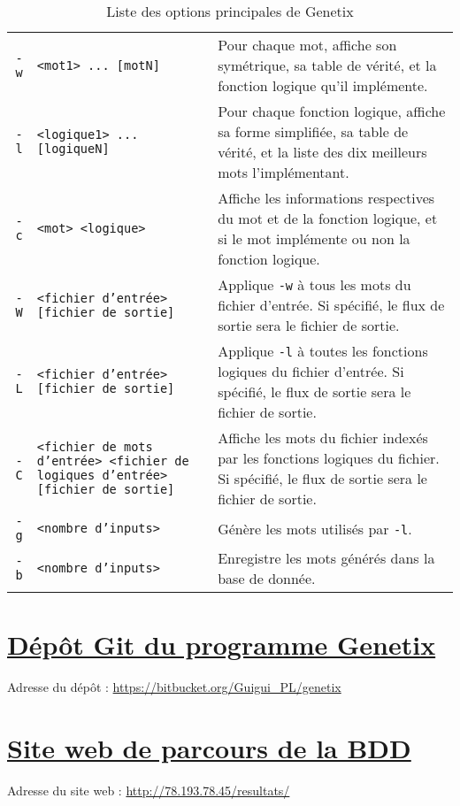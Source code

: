 \begin{table}[!h]
\centering
\begin{tabular}{r L{6cm} L{8cm}}
\toprule
{} &  & \\
\midrule
{} \texttt{-w} & \texttt{<mot1> ... [motN]} & Pour chaque mot, affiche son symétrique, sa table de vérité, et la fonction logique qu'il implémente. \\
 \texttt{-l} & \texttt{<logique1> ... [logiqueN]} & Pour chaque fonction logique, affiche sa forme simplifiée, sa table de vérité, et la liste des dix meilleurs mots l'implémentant. \\
 \texttt{-c} & \texttt{<mot> <logique>} & Affiche les informations respectives du mot et de la fonction logique, et si le mot implémente ou non la fonction logique. \\
\midrule
{} \texttt{-W} & \texttt{<fichier d'entrée> [fichier de sortie]} & Applique \texttt{-w} à tous les mots du fichier d'entrée. \newline Si spécifié, le flux de sortie sera le fichier de sortie. \\
 \texttt{-L} & \texttt{<fichier d'entrée> [fichier de sortie]} & Applique \texttt{-l} à toutes les fonctions logiques du fichier d'entrée. \newline Si spécifié, le flux de sortie sera le fichier de sortie. \\
 \texttt{-C} & \texttt{<fichier de mots d'entrée> <fichier de logiques d'entrée> [fichier de sortie]} & Affiche les mots du fichier indexés par les fonctions logiques du fichier. \newline Si spécifié, le flux de sortie sera le fichier de sortie. \\
\midrule
{} \texttt{-g} & \texttt{<nombre d'inputs>} & Génère les mots utilisés par \texttt{-l}. \\
 \texttt{-b} & \texttt{<nombre d'inputs>} & Enregistre les mots générés dans la base de donnée. \\
\bottomrule
\end{tabular}
\caption{\label{tab:technique/genetix/utilisation}Liste des options principales de Genetix}
\end{table}

\section{\href{https://bitbucket.org/Guigui_PL/genetix}{Dépôt Git du programme Genetix}}
\label{sec:annexes/git}
\par
Adresse du dépôt : \url{https://bitbucket.org/Guigui_PL/genetix}

\section{\href{http://78.193.78.45/resultats/}{Site web de parcours de la BDD}}
\label{sec:annexes/web}
\par
Adresse du site web : \url{http://78.193.78.45/resultats/}